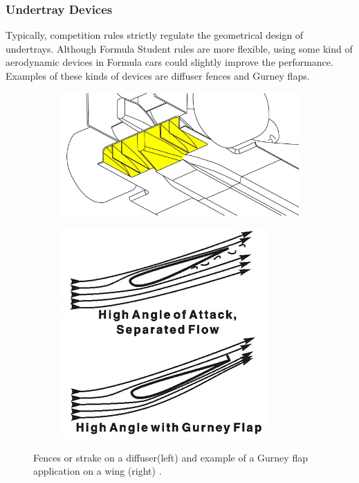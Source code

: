 \subsubsection{Undertray Devices}
Typically, competition rules strictly regulate the geometrical design of undertrays. Although Formula Student rules are more flexible, using some kind of aerodynamic devices in Formula cars could slightly improve the performance. Examples of these kinds of devices are diffuser fences and Gurney flaps.

\begin{figure}[!ht]
\begin{center}
%    
  \begin{subfigure}[b]{0.4\textwidth}
    \includegraphics[scale=0.6]{Figures/diffuser_fences.jpg}
  \end{subfigure}
  \begin{subfigure}[b]{0.4\textwidth}
    \includegraphics[scale=0.8]{Figures/Gurney.jpg}
  \end{subfigure}
%  
  \caption{Fences or strake on a diffuser(left) and example of a Gurney flap application on a wing (right) \cite{Anonymous2020GurneyFlap}.}
    \label{fig:gurney}
\end{center}
\end{figure}

